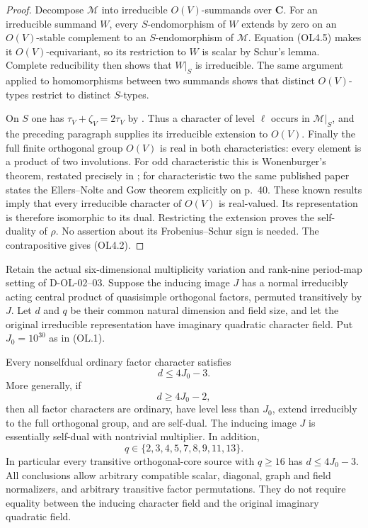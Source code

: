 \begin{proof}
Decompose $\mathcal M$ into irreducible $O(V)$-summands over
$\mathbf C$.  For an irreducible summand $W$, every
$S$-endomorphism of $W$ extends by zero on an $O(V)$-stable complement
to an $S$-endomorphism of $\mathcal M$.  Equation (OL4.5) makes it
$O(V)$-equivariant, so its restriction to $W$ is scalar by Schur's
lemma.  Complete reducibility then shows that $W|_S$ is irreducible.
The same argument applied to homomorphisms between two summands
shows that distinct $O(V)$-types restrict to distinct $S$-types.

On $S$ one has $\tau_V+\zeta_V=2\tau_V$ by
\cite[Lemma~3.3, p.~160]{OL:GLT2024}.  Thus a character of level
$\ell$ occurs in $\mathcal M|_S$, and the preceding paragraph
supplies its irreducible extension to $O(V)$.
Finally the full finite orthogonal group $O(V)$ is real in both
characteristics: every element is a product of two involutions.
For odd characteristic this is Wonenburger's theorem, restated
precisely in \cite[Theorem~1, p.~44]{OL:KTV2023}; for characteristic
two the same published paper states the Ellers--Nolte and Gow theorem
explicitly on p.~40.  These known results imply that every irreducible
character of $O(V)$ is real-valued.  Its representation is therefore
isomorphic to its dual.  Restricting the extension proves the
self-duality of $\rho$.  No assertion about its Frobenius--Schur sign
is needed.  The contrapositive gives (OL4.2).
\end{proof}

\begin{theorem}
\label{D-OL-05}
Retain the actual six-dimensional multiplicity variation and
rank-nine period-map setting of D-OL-02--03.  Suppose the inducing
image $J$ has a normal irreducibly acting central product of
quasisimple orthogonal factors, permuted transitively by $J$.
Let $d$ and $q$ be their common natural dimension and field size,
and let the original irreducible representation have imaginary
quadratic character field.  Put $J_0=10^{30}$ as in (OL.1).

Every nonselfdual ordinary factor character satisfies
\[
                         d\le4J_0-3.                         \tag{OL4.6}
\]
More generally, if
\[
                         d\ge4J_0-2,                         \tag{OL4.7}
\]
then all factor characters are ordinary, have level less than
$J_0$, extend irreducibly to the full orthogonal group, and are
self-dual.  The inducing image $J$ is essentially self-dual with
nontrivial multiplier.  In addition,
\[
                 q\in\{2,3,4,5,7,8,9,11,13\}.                \tag{OL4.8}
\]
In particular every transitive orthogonal-core source with
$q\ge16$ has $d\le4J_0-3$.  All conclusions allow arbitrary
compatible scalar, diagonal, graph and field normalizers, and
arbitrary transitive factor permutations.  They do not require
equality between the inducing character field and the original
imaginary quadratic field.
\end{theorem}

